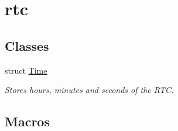 \hypertarget{group__rtc}{}\section{rtc}
\label{group__rtc}
\subsection*{Classes}
\begin{DoxyCompactItemize}
\item 
struct \hyperlink{structTime}{Time}
\begin{DoxyCompactList}\small\item\em Stores hours, minutes and seconds of the R\+TC. \end{DoxyCompactList}\end{DoxyCompactItemize}
\subsection*{Macros}

